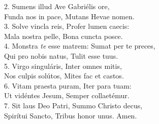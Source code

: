 2. Sumens illud Ave Gabriélis ore,\\
Funda nos in pace, Mutans Hevae nomen.\\

3. Solve vincla reis, Profer lumen caecis:\\
Mala nostra pelle, Bona cuncta posce.\\

4. Monstra \textit{te} esse matrem: Sumat per te preces,\\
Qui pro nobis natus, Tulit esse tuus.\\

5. Virgo singuláris, Inter omnes mitis,\\
Nos culpis solútos, Mites fac et castos.\\

6. Vitam praesta puram, Iter para tuam:\\
Ut vidéntes Jesum, Semper collaetémur.\\

7. Sit laus Deo Patri, Summo Christo decus,\\
Spirítui Sancto, Tribus honor unus. Amen.\\
